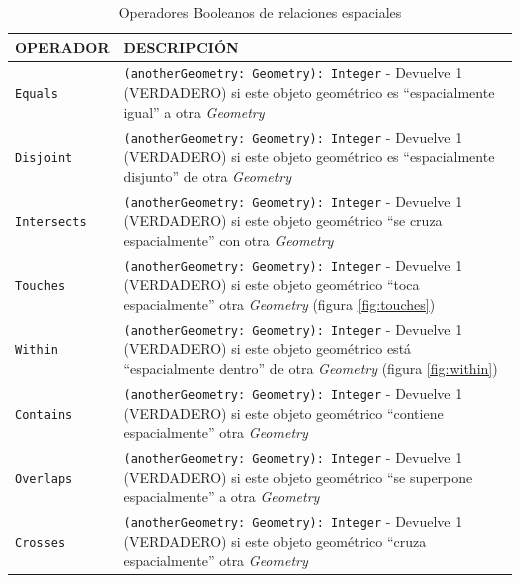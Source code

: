  
 \begin{table}[H]
 	\caption{Operadores Booleanos de relaciones espaciales}
 	\label{estandar-funciones}
 	\centering
 	\begin{tabular}{|l|m{9.5cm}|}
 		\hline
 		\rowcolor[HTML]{EFEFEF} 
 		{\textbf{OPERADOR}} & { \textbf{DESCRIPCIÓN}} \\ \hline
 		\texttt{Equals}	&    \texttt{(anotherGeometry: Geometry): Integer} - Devuelve 1 (VERDADERO) si este objeto geométrico es ``espacialmente igual'' a otra \textit{Geometry}        \\ \hline
 		\texttt{Disjoint}	&       \texttt{(anotherGeometry: Geometry): Integer} - Devuelve 1 (VERDADERO) si este objeto geométrico es ``espacialmente disjunto'' de otra \textit{Geometry}              \\ \hline
 		\texttt{Intersects}	&   \texttt{(anotherGeometry: Geometry): Integer} - Devuelve 1 (VERDADERO) si este objeto geométrico ``se cruza espacialmente'' con otra \textit{Geometry}        \\ \hline
 		\texttt{Touches} &     \texttt{(anotherGeometry: Geometry): Integer} - Devuelve 1 (VERDADERO) si este objeto geométrico ``toca espacialmente'' otra \textit{Geometry}   (figura \ref{fig:touches})     \\ \hline
 		\texttt{Within}	&    \texttt{(anotherGeometry: Geometry): Integer} - Devuelve 1 (VERDADERO) si este objeto geométrico está ``espacialmente dentro'' de otra \textit{Geometry} (figura \ref{fig:within})               \\ \hline
 		\texttt{Contains} &     \texttt{(anotherGeometry: Geometry): Integer} -  Devuelve 1 (VERDADERO) si este objeto geométrico ``contiene espacialmente'' otra \textit{Geometry}      \\ \hline
 		\texttt{Overlaps}	&     \texttt{(anotherGeometry: Geometry): Integer} - Devuelve 1 (VERDADERO) si este objeto geométrico ``se superpone espacialmente'' a otra \textit{Geometry}         \\ \hline
 		\texttt{Crosses} &    \texttt{(anotherGeometry: Geometry): Integer} - Devuelve 1 (VERDADERO) si este objeto geométrico ``cruza espacialmente'' otra \textit{Geometry}    \\ \hline	
 	\end{tabular}
 \end{table}

